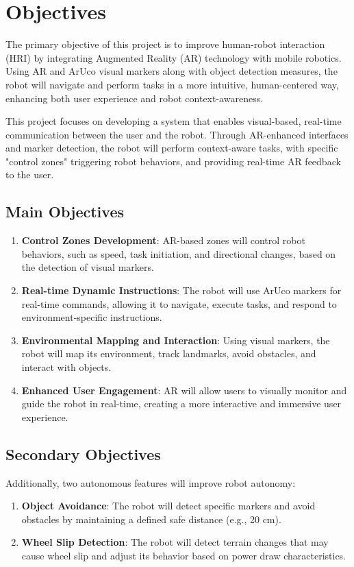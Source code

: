 \section{\label{sec:objectives}Objectives}

The primary objective of this project is to improve human-robot interaction (HRI) by integrating Augmented Reality (AR) technology with mobile robotics. Using AR and ArUco visual markers along with object detection measures, the robot will navigate and perform tasks in a more intuitive, human-centered way, enhancing both user experience and robot context-awareness.

This project focuses on developing a system that enables visual-based, real-time communication between the user and the robot. Through AR-enhanced interfaces and marker detection, the robot will perform context-aware tasks, with specific "control zones" triggering robot behaviors, and providing real-time AR feedback to the user.

\subsection{Main Objectives}
\begin{enumerate}
	\item \textbf{Control Zones Development}: AR-based zones will control robot behaviors, such as speed, task initiation, and directional changes, based on the detection of visual markers.
	\item \textbf{Real-time Dynamic Instructions}: The robot will use ArUco markers for real-time commands, allowing it to navigate, execute tasks, and respond to environment-specific instructions.
	\item \textbf{Environmental Mapping and Interaction}: Using visual markers, the robot will map its environment, track landmarks, avoid obstacles, and interact with objects.
	\item \textbf{Enhanced User Engagement}: AR will allow users to visually monitor and guide the robot in real-time, creating a more interactive and immersive user experience.
\end{enumerate}

\subsection{Secondary Objectives}

Additionally, two autonomous features will improve robot autonomy:
\begin{enumerate}
	\item \textbf{Object Avoidance}: The robot will detect specific markers and avoid obstacles by maintaining a defined safe distance (e.g., 20 cm).
	\item \textbf{Wheel Slip Detection}: The robot will detect terrain changes that may cause wheel slip and adjust its behavior based on power draw characteristics.
\end{enumerate}




